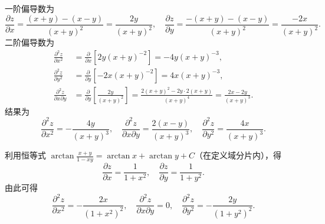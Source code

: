 \begin{solution}
    一阶偏导数为
    \begin{equation}
        \frac{\partial z}{\partial x} = \frac{(x+y) - (x-y)}{(x+y)^{2}} = \frac{2y}{(x+y)^{2}}, \quad \frac{\partial z}{\partial y} = \frac{-(x+y) - (x-y)}{(x+y)^{2}} = \frac{-2x}{(x+y)^{2}}.
    \end{equation}
    二阶偏导数为
    \begin{equation}
        \begin{aligned}
            \frac{\partial^{2} z}{\partial x^{2}}        & = \frac{\partial}{\partial x} \left[ 2y(x+y)^{-2} \right] = -4y(x+y)^{-3},                                                                      \\
            \frac{\partial^{2} z}{\partial y^{2}}        & = \frac{\partial}{\partial y} \left[ -2x(x+y)^{-2} \right] = 4x(x+y)^{-3},                                                                      \\
            \frac{\partial^{2} z}{\partial x \partial y} & = \frac{\partial}{\partial y} \left[ \frac{2y}{(x+y)^{2}} \right] = \frac{2(x+y)^{2} - 2y \cdot 2(x+y)}{(x+y)^{4}} = \frac{2x - 2y}{(x+y)^{3}}.
        \end{aligned}
    \end{equation}
    结果为
    \begin{equation}
        \boxed{\frac{\partial^{2} z}{\partial x^{2}} = -\frac{4y}{(x+y)^{3}}, \quad \frac{\partial^{2} z}{\partial x \partial y} = \frac{2(x-y)}{(x+y)^{3}}, \quad \frac{\partial^{2} z}{\partial y^{2}} = \frac{4x}{(x+y)^{3}}.}
    \end{equation}

    利用恒等式 $\arctan \frac{x+y}{1-xy} = \arctan x + \arctan y + C$（在定义域分片内），得
    \begin{equation}
        \frac{\partial z}{\partial x} = \frac{1}{1+x^{2}}, \quad \frac{\partial z}{\partial y} = \frac{1}{1+y^{2}}.
    \end{equation}
    由此可得
    \begin{equation}
        \boxed{\frac{\partial^{2} z}{\partial x^{2}} = -\frac{2x}{(1+x^{2})^{2}}, \quad \frac{\partial^{2} z}{\partial x \partial y} = 0, \quad \frac{\partial^{2} z}{\partial y^{2}} = -\frac{2y}{(1+y^{2})^{2}}.}
    \end{equation}


\end{solution}
